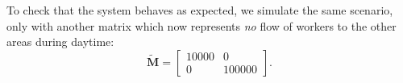 %
%
%    
%
%    
%
%        
%
%            
%            
%
%
%
%            
%

To check that the system behaves as expected, we simulate the same scenario, only with another matrix which now represents \textit{no} flow of workers to the other areas during daytime:
\begin{equation}\label{eq:test_matrix}
	\mathbf{\widetilde{M}} = \begin{bmatrix}
		10000 & 0 \\
		0 & 100000 
	\end{bmatrix}.
\end{equation}

